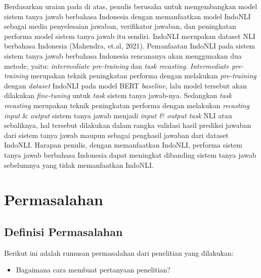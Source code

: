 Berdasarkan uraian pada di atas, penulis berusaha untuk mengembangkan model sistem tanya jawab berbahasa Indonesia dengan memanfaatkan model IndoNLI sebagai media penyelesaian jawaban, verifikator jawaban, dan peningkatan performa model sistem tanya jawab itu sendiri. IndoNLI merupakan dataset NLI berbahasa Indonesia (Mahendra, et.al, 2021). Pemanfaatan IndoNLI pada sistem sistem tanya jawab berbahasa Indonesia rencananya akan menggunakan dua metode, yaitu: \emph{intermediate pre-training} dan \emph{task recasting}. \emph{Intermediate pre-training} merupakan teknik peningkatan performa dengan melakukan \emph{pre-training} dengan \emph{dataset} IndoNLI pada model BERT \emph{baseline}, lalu model tersebut akan dilakukan \emph{fine-tuning} untuk \emph{task} sistem tanya jawab-nya. Sedangkan \emph{task recasting} merupakan teknik peningkatan performa dengan melakukan \emph{recasting input} \& \emph{output} sistem tanya jawab menjadi \emph{input \& output task} NLI atau sebaliknya, hal tersebut dilakukan dalam rangka validasi hasil prediksi jawaban dari sistem tanya jawab maupun sebagai penghasil jawaban dari dataset IndoNLI. Harapan penulis, dengan memanfaatkan IndoNLI, performa sistem tanya jawab berbahasa Indonesia dapat meningkat dibanding sistem tanya jawab sebelumnya yang tidak memanfaatkan IndoNLI.


\section{Permasalahan}
\label{sec:masalah}
\noindent{}

\subsection{Definisi Permasalahan}
\label{sec:definisiMasalah}
Berikut ini adalah rumusan permasalahan dari penelitian yang dilakukan:
\begin{itemize}
	\item Bagaimana cara membuat pertanyaan penelitian?
\end{itemize}
\noindent{}

